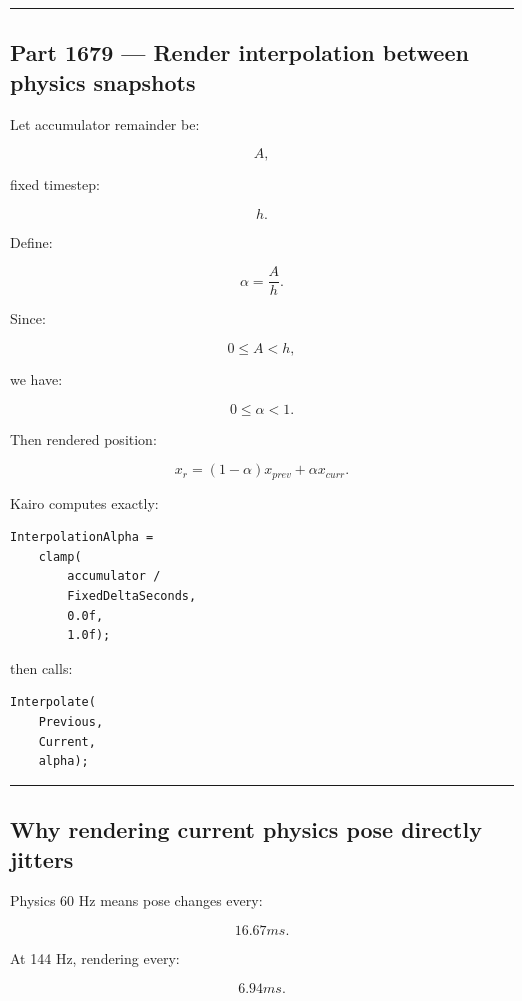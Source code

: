 \begin{center}\rule{0.5\linewidth}{0.5pt}\end{center}

\subsection{Part 1679 --- Render interpolation between physics snapshots}\label{06-engine-ii-ch037-part-1679-render-interpolation-between-physics-snapshots}

Let accumulator remainder be:

\[
A,
\]

fixed timestep:

\[
h.
\]

Define:

\[
\boxed{
\alpha
=
\frac{A}{h}.
}
\]

Since:

\[
0\le A<h,
\]

we have:

\[
0\le\alpha<1.
\]

Then rendered position:

\[
\boxed{
x_r
=
(1-\alpha)x_{prev}
+
\alpha x_{curr}.
}
\]

Kairo computes exactly:

\begin{verbatim}
InterpolationAlpha =
    clamp(
        accumulator /
        FixedDeltaSeconds,
        0.0f,
        1.0f);
\end{verbatim}

then calls:

\begin{verbatim}
Interpolate(
    Previous,
    Current,
    alpha);
\end{verbatim}

\begin{center}\rule{0.5\linewidth}{0.5pt}\end{center}

\subsection{Why rendering current physics pose directly jitters}\label{06-engine-ii-ch037-why-rendering-current-physics-pose-directly-jitters}

Physics 60 Hz means pose changes every:

\[
16.67ms.
\]

At 144 Hz, rendering every:

\[
6.94ms.
\]

